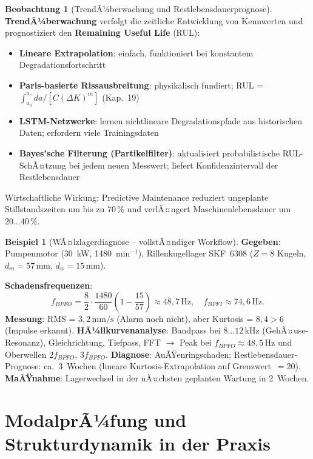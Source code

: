 ﻿\documentclass[a4paper,12pt]{report}
\theoremstyle{definition}
\newtheorem{beispiel}{Beispiel}
\newtheorem{beobachtung}{Beobachtung}
\begin{document}
\begin{beobachtung}[TrendÃ¼berwachung und Restlebensdauerprognose]
\textbf{TrendÃ¼berwachung} verfolgt die zeitliche Entwicklung von Kennwerten
und prognostiziert den \textbf{Remaining Useful Life} (RUL):
\begin{itemize}
    \item[-] \textbf{Lineare Extrapolation}: einfach, funktioniert bei
          konstantem Degradationsfortschritt
    \item[-] \textbf{Paris-basierte Rissausbreitung}: physikalisch fundiert;
          RUL = $\int_{a_0}^{a_c} da / [C(\Delta K)^m]$ (Kap.~19)
    \item[-] \textbf{LSTM-Netzwerke}: lernen nichtlineare Degradationspfade
          aus historischen Daten; erfordern viele Trainingsdaten
    \item[-] \textbf{Bayes'sche Filterung (Partikelfilter)}: aktualisiert
          probabilistische RUL-SchÃ¤tzung bei jedem neuen Messwert;
          liefert Konfidenzintervall der Restlebensdauer
\end{itemize}
Wirtschaftliche Wirkung: Predictive Maintenance reduziert ungeplante
Stillstandszeiten um bis zu $70\,\%$ und verlÃ¤ngert Maschinenlebensdauer
um $20\ldots40\,\%$.
\end{beobachtung}

\begin{beispiel}[WÃ¤lzlagerdiagnose -- vollstÃ¤ndiger Workflow]
\textbf{Gegeben}: Pumpenmotor (30~kW, 1480~min$^{-1}$), Rillenkugellager SKF~6308
($Z=8$ Kugeln, $d_m = 57\,\mathrm{mm}$, $d_w = 15\,\mathrm{mm}$).

\noindent\textbf{Schadensfrequenzen}:
\[
  f_{BPFO} = \frac{8}{2}\cdot\frac{1480}{60}\left(1 - \frac{15}{57}\right) \approx 48{,}7\,\mathrm{Hz},
  \quad f_{BPFI} \approx 74{,}6\,\mathrm{Hz}.
\]
\textbf{Messung}: RMS = $3{,}2\,\mathrm{mm/s}$ (Alarm noch nicht), aber
Kurtosis = $8{,}4 > 6$ (Impulse erkannt).
\textbf{HÃ¼llkurvenanalyse}: Bandpass bei $8\ldots12\,\mathrm{kHz}$ (GehÃ¤use-Resonanz),
Gleichrichtung, Tiefpass, FFT $\to$ Peak bei $f_{BPFO} \approx 48{,}5\,\mathrm{Hz}$
und Oberwellen $2f_{BPFO}$, $3f_{BPFO}$.
\textbf{Diagnose}: AuÃŸenringschaden; Restlebensdauer-Prognose: ca.\ 3~Wochen
(lineare Kurtosis-Extrapolation auf Grenzwert~$= 20$).
\textbf{MaÃŸnahme}: Lagerwechsel in der nÃ¤chsten geplanten Wartung in 2~Wochen.
\end{beispiel}

\section{ModalprÃ¼fung und Strukturdynamik in der Praxis}
\end{document}
